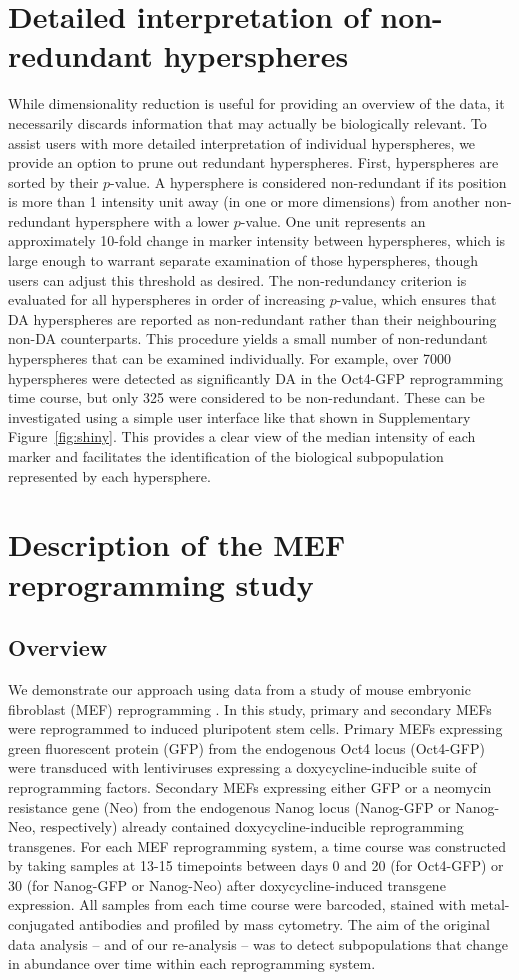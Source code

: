 \documentclass{article}
\begin{document}
\section{Detailed interpretation of non-redundant hyperspheres}
While dimensionality reduction is useful for providing an overview of the data, it necessarily discards information that may actually be biologically relevant.
To assist users with more detailed interpretation of individual hyperspheres, we provide an option to prune out redundant hyperspheres.
First, hyperspheres are sorted by their $p$-value.
A hypersphere is considered non-redundant if its position is more than 1 intensity unit away (in one or more dimensions) from another non-redundant hypersphere with a lower $p$-value.
One unit represents an approximately 10-fold change in marker intensity between hyperspheres, which is large enough to warrant separate examination of those hyperspheres, though users can adjust this threshold as desired.
The non-redundancy criterion is evaluated for all hyperspheres in order of increasing $p$-value, which ensures that DA hyperspheres are reported as non-redundant rather than their neighbouring non-DA counterparts.
This procedure yields a small number of non-redundant hyperspheres that can be examined individually.
For example, over 7000 hyperspheres were detected as significantly DA in the Oct4-GFP reprogramming time course, but only 325 were considered to be non-redundant.
These can be investigated using a simple user interface like that shown in Supplementary Figure~\ref{fig:shiny}.
This provides a clear view of the median intensity of each marker and facilitates the identification of the biological subpopulation represented by each hypersphere.

\section{Description of the MEF reprogramming study}

\subsection{Overview}
We demonstrate our approach using data from a study of mouse embryonic fibroblast (MEF) reprogramming \cite{zunder2015continuous}.
In this study, primary and secondary MEFs were reprogrammed to induced pluripotent stem cells.
Primary MEFs expressing green fluorescent protein (GFP) from the endogenous Oct4 locus (Oct4-GFP) were transduced with lentiviruses expressing a doxycycline-inducible suite of reprogramming factors.
Secondary MEFs expressing either GFP or a neomycin resistance gene (Neo) from the endogenous Nanog locus (Nanog-GFP or Nanog-Neo, respectively) already contained doxycycline-inducible reprogramming transgenes.
For each MEF reprogramming system, a time course was constructed by taking samples at 13-15 timepoints between days 0 and 20 (for Oct4-GFP) or 30 (for Nanog-GFP or Nanog-Neo) after doxycycline-induced transgene expression.
All samples from each time course were barcoded, stained with metal-conjugated antibodies and profiled by mass cytometry.
The aim of the original data analysis -- and of our re-analysis -- was to detect subpopulations that change in abundance over time within each reprogramming system.
\end{document}

